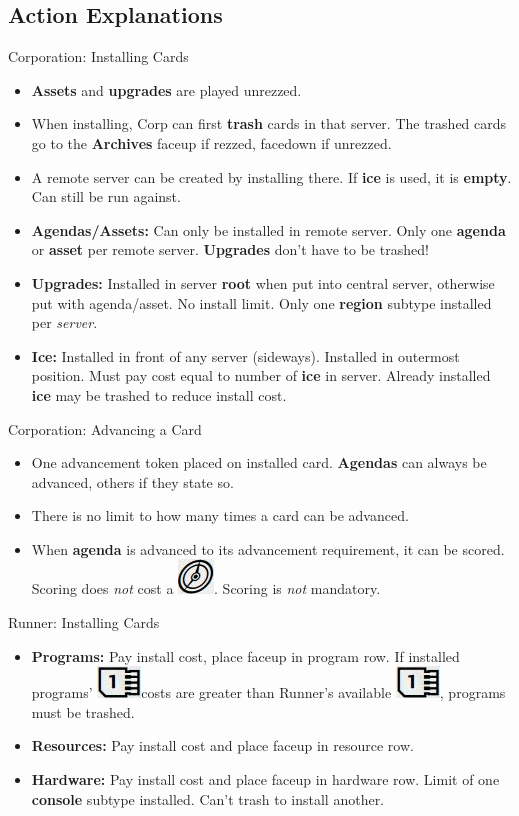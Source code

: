 \documentclass[12pt]{article}
\newenvironment{itemizeCustom}
{\begin{itemize}
  \setlength{\itemsep}{1pt}
  \setlength{\parskip}{0pt}
  \setlength{\parsep}{0pt}}
{\end{itemize}}
\newcommand{\action}{\includegraphics[scale=0.40]{images/actionLarge.jpg}\hspace{0.3em}}
\newcommand{\memoryUnit}{\includegraphics[scale=0.40]{images/memoryUnitLarge.jpg}\hspace{0.3em}}
\newcommand{\memoryUnitNoSpace}{\includegraphics[scale=0.40]{images/memoryUnitLarge.jpg}}
\begin{document}
\begin{multicols*}{2}
\section*{Action Explanations}
Corporation: Installing Cards
\begin{itemizeCustom}
	\item \textbf{Assets} and \textbf{upgrades} are played unrezzed. 
	\item When installing, Corp can first \textbf{trash} cards in that server. The trashed cards go to the \textbf{Archives} faceup if rezzed, facedown if unrezzed.
	\item A remote server can be created by installing there. If \textbf{ice} is used, it is \textbf{empty}. Can still be run against.
	\item \textbf{Agendas/Assets:} Can only be installed in remote server. Only one \textbf{agenda} or \textbf{asset} per remote server. \textbf{Upgrades} don't have to be trashed!
	\item \textbf{Upgrades:} Installed in server \textbf{root} when put into central server, otherwise put with agenda/asset. No install limit. Only one \textbf{region} subtype installed per \emph{server}.
	\item \textbf{Ice:} Installed in front of any server (sideways). Installed in outermost position. Must pay cost equal to number of \textbf{ice} in server. Already installed \textbf{ice} may be trashed to reduce install cost.
\end{itemizeCustom}

Corporation: Advancing a Card
\begin{itemizeCustom}
	\item One advancement token placed on installed card. \textbf{Agendas} can always be advanced, others if they state so.
	\item There is no limit to how many times a card can be advanced. 
	\item When \textbf{agenda} is advanced to its advancement requirement, it can be scored. Scoring does \emph{not} cost a \action. Scoring is \emph{not} mandatory.
\end{itemizeCustom}

Runner: Installing Cards
\begin{itemizeCustom}
	\item \textbf{Programs:} Pay install cost, place faceup in program row. If installed programs' \memoryUnit costs are greater than Runner's available \memoryUnitNoSpace, programs must be trashed.
	\item \textbf{Resources:} Pay install cost and place faceup in resource row.
	\item \textbf{Hardware:} Pay install cost and place faceup in hardware row. Limit of one \textbf{console} subtype installed. Can't trash to install another.
\end{itemizeCustom}


\end{multicols*}
\end{document}
